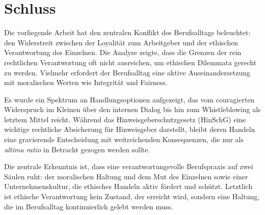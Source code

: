 \documentclass[
    12pt,               %
    a4paper,            %
    ngerman             %
]{scrartcl}
\begin{document}
\section{Schluss}

Die vorliegende Arbeit hat den zentralen Konflikt des Berufsalltags beleuchtet: den Widerstreit zwischen der Loyalität zum Arbeitgeber und der ethischen Verantwortung des Einzelnen. Die Analyse zeigte, dass die Grenzen der rein rechtlichen Verantwortung oft nicht ausreichen, um ethischen Dilemmata gerecht zu werden. Vielmehr erfordert der Berufsalltag eine aktive Auseinandersetzung mit moralischen Werten wie Integrität und Fairness.

Es wurde ein Spektrum an Handlungsoptionen aufgezeigt, das vom couragierten Widerspruch im Kleinen über den internen Dialog bis hin zum Whistleblowing als letztem Mittel reicht. Während das Hinweisgeberschutzgesetz (HinSchG) eine wichtige rechtliche Absicherung für Hinweisgeber darstellt, bleibt deren Handeln eine gravierende Entscheidung mit weitreichenden Konsequenzen, die nur als \textit{ultima ratio} in Betracht gezogen werden sollte.

Die zentrale Erkenntnis ist, dass eine verantwortungsvolle Berufspraxis auf zwei Säulen ruht: der moralischen Haltung und dem Mut des Einzelnen sowie einer Unternehmenskultur, die ethisches Handeln aktiv fördert und schützt. Letztlich ist ethische Verantwortung kein Zustand, der erreicht wird, sondern eine Haltung, die im Berufsalltag kontinuierlich gelebt werden muss.


\newpage %
\nocite{*}
\printbibliography[title={Literaturverzeichnis}]
\end{document}
